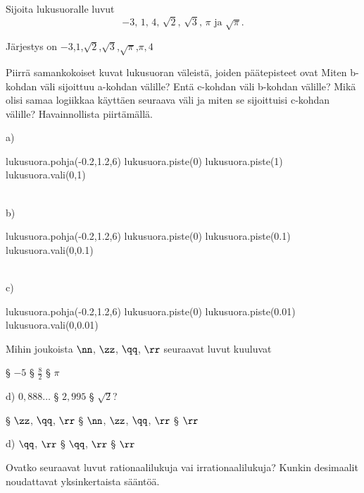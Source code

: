 \begin{tehtavasivu}

\begin{tehtava}%
Sijoita lukusuoralle luvut
\[
\mbox{$-3$, $1$, $4$, $\sqrt{2}$, $\sqrt{3}$, $\pi$ ja $\sqrt{\pi}$.}
\]
\begin{vastaus}
Järjestys on \mbox{$-3$,$1$,$\sqrt{2}$,$\sqrt{3}$,$\sqrt{\pi}$,$\pi,4$}
\end{vastaus}
\end{tehtava}

\begin{tehtava} %
Piirrä samankokoiset kuvat lukusuoran väleistä, joiden päätepisteet ovat 
Miten b-kohdan väli sijoittuu a-kohdan välille? Entä c-kohdan väli b-kohdan välille? Mikä olisi samaa logiikkaa käyttäen seuraava väli ja miten se sijoittuisi c-kohdan välille? Havainnollista piirtämällä.
\begin{vastaus}
a)
\begin{kuva}
	lukusuora.pohja(-0.2,1.2,6)
	lukusuora.piste(0)
	lukusuora.piste(1)
	lukusuora.vali(0,1)
\end{kuva}
\\
b) 
\begin{kuva}
	lukusuora.pohja(-0.2,1.2,6)
	lukusuora.piste(0)
	lukusuora.piste(0.1)
	lukusuora.vali(0,0.1)
\end{kuva}
\\
c) 
\begin{kuva}
	lukusuora.pohja(-0.2,1.2,6)
	lukusuora.piste(0)
	lukusuora.piste(0.01)
	lukusuora.vali(0,0.01)
\end{kuva}
\end{vastaus}
\end{tehtava}


\begin{tehtava}
Mihin joukoista $\nn$, $\zz$, $\qq$, $\rr$ seuraavat luvut kuuluvat

§ $-5$ 
§ $\frac82$ 
§ $\pi$

d) $0,888\ldots$ 
§ $2,995$ 
§ $\sqrt{2}$?

\begin{vastaus}
§ $\zz$, $\qq$, $\rr$ 
§ $\nn$, $\zz$, $\qq$, $\rr$ 
§ $\rr$

d) $\qq$, $\rr$ 
§ $\qq$, $\rr$ 
§ $\rr$
\end{vastaus}
\end{tehtava}

\begin{tehtava}
Ovatko seuraavat luvut rationaalilukuja vai irrationaalilukuja? Kunkin desimaalit
noudattavat yksinkertaista sääntöä.
\begin{vastaus}
\end{vastaus}
\end{tehtava}


\end{tehtavasivu}
